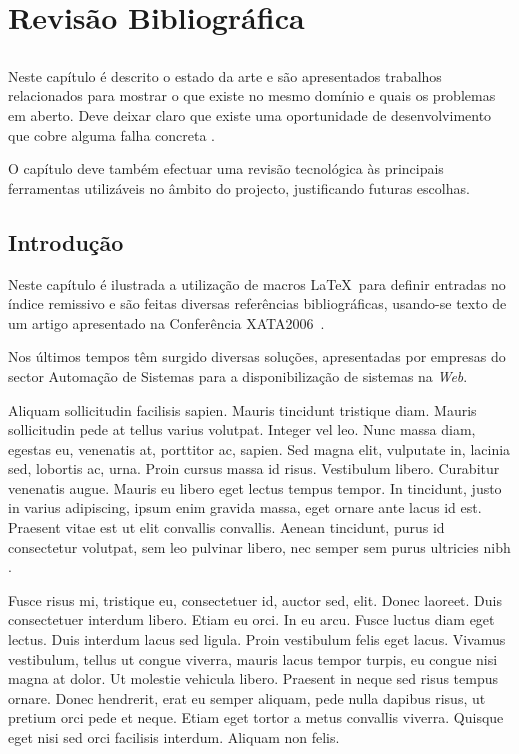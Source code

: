 \chapter{Revisão Bibliográfica} \label{chap:sota}

\section*{}

Neste capítulo é descrito o estado da arte e são
apresentados trabalhos relacionados para mostrar o que existe no
mesmo domínio e quais os problemas em aberto.
Deve deixar claro que existe uma oportunidade de desenvolvimento que
cobre alguma falha concreta .

O capítulo deve também efectuar uma revisão tecnológica às principais
ferramentas utilizáveis no âmbito do projecto, justificando futuras
escolhas.

\section{Introdução}

Neste capítulo é ilustrada a utilização de macros \LaTeX\ para definir
entradas no índice remissivo e são feitas diversas referências
bibliográficas, usando-se texto de um artigo apresentado na Conferência 
XATA2006~\citep{kn:MVL06-xata}.

Nos últimos tempos têm surgido diversas soluções, apresentadas por
empresas do sector Automação de Sistemas para a disponibilização de
sistemas \scadadms{} na \textit{Web}.

Aliquam sollicitudin facilisis sapien. Mauris tincidunt tristique
diam. Mauris sollicitudin pede at tellus varius volutpat. Integer vel
leo. Nunc massa diam, egestas eu, venenatis at, porttitor ac,
sapien. Sed magna elit, vulputate in, lacinia sed, lobortis ac,
urna. Proin cursus massa id risus. Vestibulum libero. Curabitur
venenatis augue. Mauris eu libero eget lectus tempus tempor. In
tincidunt, justo in varius adipiscing, ipsum enim gravida massa, eget
ornare ante lacus id est. Praesent vitae est ut elit convallis
convallis. Aenean tincidunt, purus id consectetur volutpat, sem leo
pulvinar libero, nec semper sem purus ultricies nibh \cite{kn:Fra94-thesis}. 

Fusce risus mi, tristique eu, consectetuer id, auctor sed, elit. Donec
laoreet. Duis consectetuer interdum libero. Etiam eu orci. In eu
arcu. Fusce luctus diam eget lectus. Duis interdum lacus sed
ligula. Proin vestibulum felis eget lacus. Vivamus vestibulum, tellus
ut congue viverra, mauris lacus tempor turpis, eu congue nisi magna at
dolor. Ut molestie vehicula libero. Praesent in neque sed risus tempus
ornare. Donec hendrerit, erat eu semper aliquam, pede nulla dapibus
risus, ut pretium orci pede et neque.
Etiam eget tortor a metus convallis viverra. Quisque eget nisi sed
orci facilisis interdum. Aliquam non felis. 

